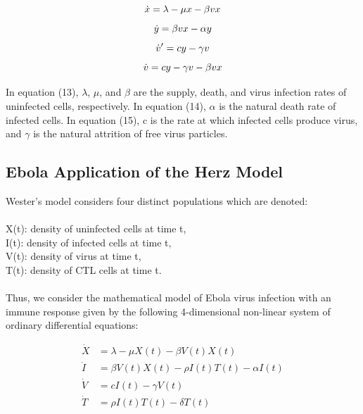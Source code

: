 \documentclass{article}
\begin{document}
\begin{equation}
		\dot x = \lambda - \mu x - \beta vx\\
\end{equation}
\begin{equation}
		\dot y = \beta vx - \alpha y\\
\end{equation}
\begin{equation}
		\dot v' = cy - \gamma v\\
\end{equation}
\begin{equation}
		\dot v = cy - \gamma v - \beta vx\\
\end{equation}

In equation (13), $\lambda$, $\mu$, and $\beta$ are the supply, death, and virus infection rates of uninfected cells, respectively.
In equation (14), $\alpha$ is the natural death rate of infected cells.
In equation (15), c is the rate at which infected cells produce virus, and $\gamma$ is the natural attrition of free virus particles.\\


\subsection{Ebola Application of the Herz Model}
Wester's model considers four distinct populations which are denoted:\\
\\
X(t): density of uninfected cells at time t,\\
I(t): density of infected cells at time t,\\
V(t): density of virus at time t,\\
T(t): density of CTL cells at time t.\\
\\
Thus, we consider the mathematical model of Ebola virus infection with an immune response given by the following 4-dimensional non-linear system of ordinary differential equations:

\begin{equation}
\begin{split}
	\dot X &= \lambda - \mu X(t) - \beta V(t)X(t) \\
	\dot I &= \beta V(t)X(t) - \rho I(t)T(t) - \alpha I(t) \\
	\dot V &= cI(t) - \gamma V(t) \\
	\dot T &= \rho I(t)T(t) - \delta T(t) \\
\end{split}
\end{equation}
\end{document}
